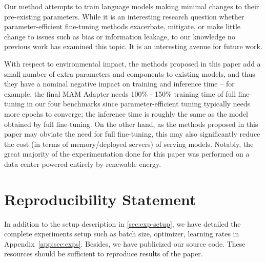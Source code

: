 Our method attempts to train language models making minimal changes to their pre-existing parameters. While it is an interesting research question whether parameter-efficient fine-tuning methods exacerbate, mitigate, or make little change to issues such as bias or information leakage, to our knowledge no previous work has examined this topic. It is an interesting avenue for future work.

With respect to environmental impact, the methods proposed in this paper add a small number of extra parameters and components to existing models, and thus they have a nominal negative impact on training and inference time -- for example, the final MAM Adapter needs 100\% - 150\% training time of full fine-tuning in our four benchmarks since parameter-efficient tuning typically needs more epochs to converge; the inference time is roughly the same as the model obtained by full fine-tuning. On the other hand, as the methods proposed in this paper may obviate the need for full fine-tuning, this may also significantly reduce the cost (in terms of memory/deployed servers) of serving models. Notably, the great majority of the experimentation done for this paper was performed on a data center powered entirely by renewable energy.

\section*{Reproducibility Statement} In addition to the setup description in \textsection\ref{sec:exp-setup}, we have detailed the complete experiments setup such as batch size, optimizer, learning rates in Appendix~\ref{app:sec:exps}. Besides, we have publicized our source code. These resources should be sufficient to reproduce results of the paper. 


